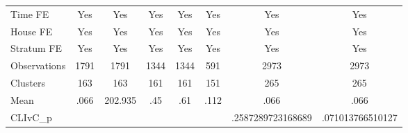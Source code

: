 {\begin{tabular}{l*{7}{c}}
Time FE         &      Yes         &      Yes         &      Yes         &      Yes         &      Yes         &      Yes         &      Yes         \\
House FE        &      Yes         &      Yes         &      Yes         &      Yes         &      Yes         &      Yes         &      Yes         \\
Stratum FE      &      Yes         &      Yes         &      Yes         &      Yes         &      Yes         &      Yes         &      Yes         \\
\midrule
Observations    &     1791         &     1791         &     1344         &     1344         &      591         &     2973         &     2973         \\
Clusters        &      163         &      163         &      161         &      161         &      151         &      265         &      265         \\
Mean            &     .066         &  202.935         &      .45         &      .61         &     .112         &     .066         &     .066         \\
CLIvC\_p         &                  &                  &                  &                  &                  &.2587289723168689         &.071013766510127         \\
\bottomrule
\end{tabular}
}
